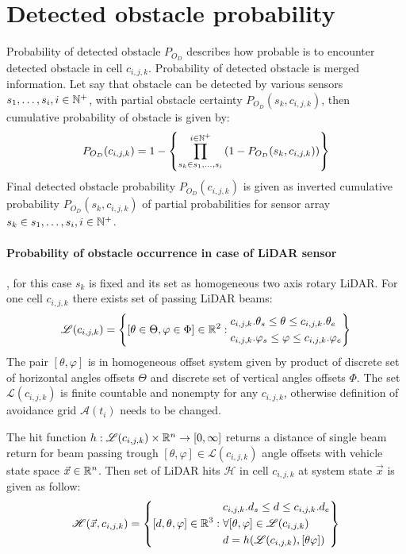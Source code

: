 \section{Detected obstacle probability}\label{sec:detectedObstacleProbability}
\noindent Probability of detected obstacle $P_{O_D}$ describes how probable is to encounter detected obstacle in cell $c_{i,j,k}$. Probability of detected obstacle is merged information. Let say that obstacle can be detected by various sensors $s_1,\dots,s_i,i\in\mathbb{N}^+$, with partial obstacle certainty $P_{O_D}(s_k,c_{i,j,k})$, then cumulative probability of obstacle is given by:
\begin{equation}\label{eq:detectedObstacleProbability}
    P_{O_D}(c_{i,j,k})= 1- \left\{\prod_{s_k\in s_1,\dots,s_i}^{i\in\mathbb{N}^+}\left(1-P_{O_D}(s_k,c_{i,j,k})\right)\right\}
\end{equation}
\noindent Final detected obstacle probability $P_{O_D}(c_{i,j,k})$ is given as inverted cumulative probability $P_{O_D}(s_k,c_{i,j,k})$ of partial probabilities for sensor array $s_k\in s_1,\dots,s_i,i\in\mathbb{N}^+$.

\paragraph{Probability of obstacle occurrence in case of LiDAR sensor}, for this case $s_k$ is fixed and its set as homogeneous two axis rotary LiDAR. For one cell $c_{i,j,k}$ there exists set of passing LiDAR beams:
\begin{equation}
    \mathscr{L}(c_{i,j,k})=\left\{[\theta\in\Theta,\varphi\in\Phi]\in\mathbb{R}^2:\begin{aligned} &c_{i,j,k}.\theta_s\le\theta\le c_{i,j,k}.\theta_e\\&c_{i,j,k}.\varphi_s\le\varphi\le c_{i,j,k}.\varphi_e \end{aligned}\right\}
\end{equation}
\noindent The pair $[\theta,\varphi]$ is in homogeneous offset system given by product of discrete set of horizontal angles offsets $\Theta$ and discrete set of vertical angles offsets $\Phi$. The set $\mathscr{L}(c_{i,j,k})$ is finite countable and nonempty for any $c_{i,j,k}$, otherwise definition of avoidance grid $\mathscr{A}(t_i)$ needs to be changed.

The hit function $h:\mathscr{L}(c_{i,j,k})\times\mathbb{R}^n\to[0,\infty]$ returns a distance of single beam return for beam passing trough $[\theta,\varphi]\in\mathscr{L}(c_{i,j,k})$ angle offsets with vehicle state space $\vec{x}\in\mathbb{R}^n$. Then set of LiDAR hits $\mathscr{H}$ in cell $c_{i,j,k}$ at system state $\vec{x}$ is given as follow:
\begin{equation}
    \mathscr{H}(\vec{x},c_{i,j,k})=\left\{[d,\theta,\varphi]\in\mathbb{R}^3: \begin{aligned}&c_{i,j,k}.d_s\le d \le c_{i,j,k}.d_e\\ &\forall [\theta,\varphi]\in\mathscr{L}(c_{i,j,k})\\&d=h(\mathscr{L}(c_{i,j,k}),[\theta\varphi])\\\end{aligned}\right\}
\end{equation}

